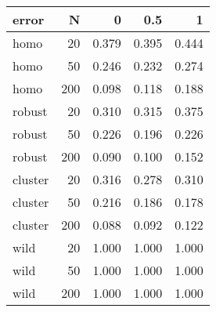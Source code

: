 
\begin{tabular}{lrrrr}
\toprule
error & N & 0 & 0.5 & 1\\
\midrule
homo & 20 & 0.379 & 0.395 & 0.444\\
homo & 50 & 0.246 & 0.232 & 0.274\\
homo & 200 & 0.098 & 0.118 & 0.188\\
robust & 20 & 0.310 & 0.315 & 0.375\\
robust & 50 & 0.226 & 0.196 & 0.226\\
robust & 200 & 0.090 & 0.100 & 0.152\\
cluster & 20 & 0.316 & 0.278 & 0.310\\
cluster & 50 & 0.216 & 0.186 & 0.178\\
cluster & 200 & 0.088 & 0.092 & 0.122\\
wild & 20 & 1.000 & 1.000 & 1.000\\
wild & 50 & 1.000 & 1.000 & 1.000\\
wild & 200 & 1.000 & 1.000 & 1.000\\
\bottomrule
\end{tabular}
